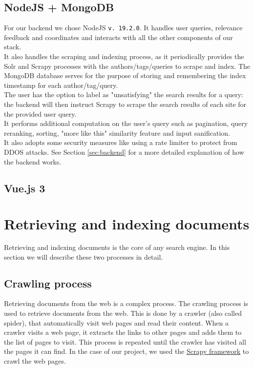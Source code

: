 \documentclass[tikz,14pt]{article}
\begin{document}
\subsection{NodeJS + MongoDB} \label{sec:node-mongo}
For our backend we chose NodeJS \verb|v. 19.2.0|. It handles user queries, relevance feedback and coordinates and interacts with all the other components of our stack.\\
It also handles the scraping and indexing process, as it periodically provides the Solr and Scrapy processes with the authors/tags/queries to scrape and index. The MongoDB database serves for the purpose of storing and remembering the index timestamp for each author/tag/query.\\
The user has the option to label as "unsatisfying" the search results for a query: the backend will then instruct Scrapy to scrape the search results of each site for the provided user query.\\
It performs additional computation on the user's query such as pagination, query reranking, sorting, "more like this" similarity feature and input sanification.\\ It also adopts some security measures like using a rate limiter to protect from DDOS attacks. See Section \ref{sec:backend} for a more detailed explanation of how the backend works.
\subsection{Vue.js 3} \label{sec:vuejs}

\section{Retrieving and indexing documents} \label{sec:retrieving}
Retrieving and indexing documents is the core of any search engine. In this section we will describe these two processes in detail.




\subsection{Crawling process} \label{sec:crawling}
Retrieving documents from the web is a complex process. 
The crawling process is used to retrieve documents from the web.
This is done by a crawler (also called spider), that automatically visit web pages and read their content.
When a crawler visits a web page, it extracts the links to other pages and adds them to the list of pages to visit.
This process is repeated until the crawler has visited all the pages it can find.
In the case of our project, we used the \href{https://scrapy.org/}{Scrapy framework} to crawl the web pages.
\end{document}
